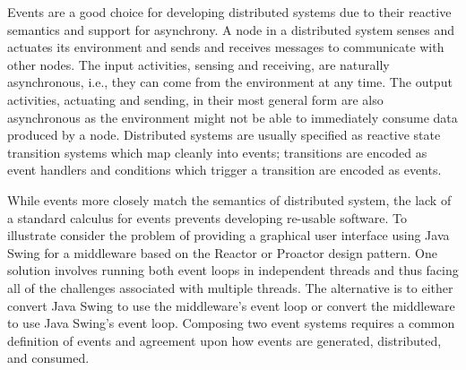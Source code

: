 Events are a good choice for developing distributed systems due to their reactive semantics and support for asynchrony.
A node in a distributed system senses and actuates its environment and sends and receives messages to communicate with other nodes.
The input activities, sensing and receiving, are naturally asynchronous, i.e., they can come from the environment at any time.
The output activities, actuating and sending, in their most general form are also asynchronous as the environment might not be able to immediately consume data produced by a node.
Distributed systems are usually specified as reactive state transition systems which map cleanly into events; transitions are encoded as event handlers and conditions which trigger a transition are encoded as events.

While events more closely match the semantics of distributed system, the lack of a standard calculus for events prevents developing re-usable software.
To illustrate consider the problem of providing a graphical user interface using Java Swing for a middleware based on the Reactor or Proactor design pattern.
One solution involves running both event loops in independent threads and thus facing all of the challenges associated with multiple threads.
The alternative is to either convert Java Swing to use the middleware's event loop or convert the middleware to use Java Swing's event loop.
Composing two event systems requires a common definition of events and agreement upon how events are generated, distributed, and consumed.


